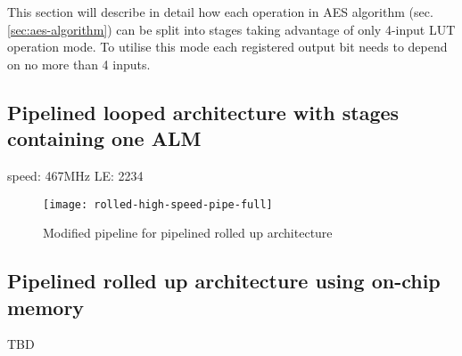 This section will describe in detail how each operation in AES algorithm (sec. \ref{sec:aes-algorithm}) can be split into stages taking advantage of only 4-input LUT operation mode. To utilise this mode each registered output bit needs to depend on no more than 4 inputs.






\subsection{Pipelined looped architecture with stages containing one ALM}

speed: 467MHz
LE: 2234


\begin{sidewaysfigure}[!h]
\label{fig:rolled-high-speed-pipe-full}
\centering
\texttt{[image: rolled-high-speed-pipe-full]}
\caption{Modified pipeline for pipelined rolled up architecture}
\end{sidewaysfigure}


\subsection{Pipelined rolled up architecture using on-chip memory}
TBD
